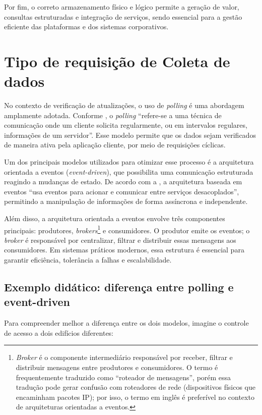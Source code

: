 \documentclass[
    12pt
    ,oneside
    ,a4paper
    ,chapter=TITLE
    ,section=TITLE
    ,sumario=abnt-6027-2012]{abntex2}
\begin{document}
Por fim, o correto armazenamento físico e lógico permite a geração de valor, consultas estruturadas e integração de serviços, sendo essencial para a gestão eficiente das plataformas e dos sistemas corporativos.

\section{Tipo de requisição de Coleta de dados}

No contexto de verificação de atualizações, o uso de \textit{polling} é uma abordagem amplamente adotada. Conforme , o \textit{polling} “refere-se a uma técnica de comunicação onde um cliente solicita regularmente, ou em intervalos regulares, informações de um servidor”. Esse modelo permite que os dados sejam verificados de maneira ativa pela aplicação cliente, por meio de requisições cíclicas.

Um dos principais modelos utilizados para otimizar esse processo é a arquitetura orientada a eventos (\textit{event-driven}), que possibilita uma comunicação estruturada reagindo a mudanças de estado. De acordo com a , a arquitetura baseada em eventos “usa eventos para acionar e comunicar entre serviços desacoplados”, permitindo a manipulação de informações de forma assíncrona e independente.

Além disso, a arquitetura orientada a eventos envolve três componentes principais: produtores, \textit{brokers}\footnote{\textit{Broker} é o componente intermediário responsável por receber, filtrar e distribuir mensagens entre produtores e consumidores. O termo é frequentemente traduzido como ``roteador de mensagens'', porém essa tradução pode gerar confusão com roteadores de rede (dispositivos físicos que encaminham pacotes IP); por isso, o termo em inglês é preferível no contexto de arquiteturas orientadas a eventos.} e consumidores. O produtor emite os eventos; o \textit{broker} é responsável por centralizar, filtrar e distribuir essas mensagens aos consumidores. Em sistemas práticos modernos, essa estrutura é essencial para garantir eficiência, tolerância a falhas e escalabilidade.

\subsection{Exemplo didático: diferença entre polling e event-driven}

Para compreender melhor a diferença entre os dois modelos, imagine o controle de acesso a dois edifícios diferentes:
\end{document}
